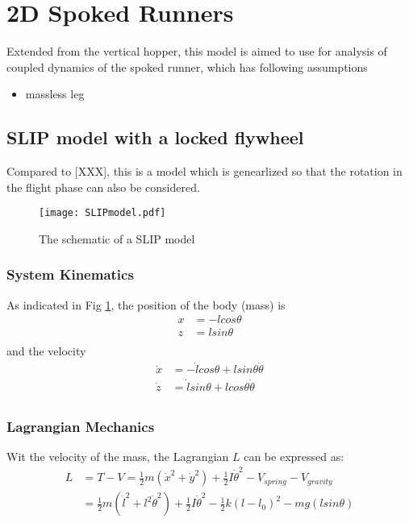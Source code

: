 \section{2D Spoked Runners}

Extended from the vertical hopper, this model is aimed to use for analysis of coupled dynamics of the spoked runner, which has following assumptions

\begin{itemize}
\item massless leg 
\end{itemize}


\subsection{SLIP model with a locked flywheel}
Compared to [XXX], this is a model which is genearlized so that the rotation in the flight phase can also be considered.
\begin{figure}[h]
\centering

\texttt{[image: SLIPmodel.pdf]}
\caption{The schematic of a SLIP model }
\label{fig.SLIPmodel}
\end{figure}

\subsubsection{System Kinematics}
As indicated in Fig \ref{fig.SLIPmodel}, the position of the body (mass) is
\begin{align*}
x &= -lcos\theta\\
z &= lsin\theta\\
\end{align*}
and the velocity
\begin{align*}
\dot x &= -\dot lcos\theta +lsin\theta\dot \theta\\
\dot z &= \dot lsin\theta + lcos\theta \dot{\theta}\\
\end{align*}





\subsubsection{Lagrangian Mechanics}
Wit the velocity of the mass, the Lagrangian $L$ can be expressed as:
\begin{align*}
L &= T-V = \frac{1}{2}m(\dot x^2+\dot y^2) + \frac{1}{2}I\dot\theta^2 - V_{spring} - V_{gravity}\\
 &= \frac{1}{2}m(\dot l^2 + l^2\dot \theta^2 )+ \frac{1}{2}I\dot\theta^2 - \frac{1}{2}k(l-l_0)^2-mg(lsin\theta)
\end{align*}


